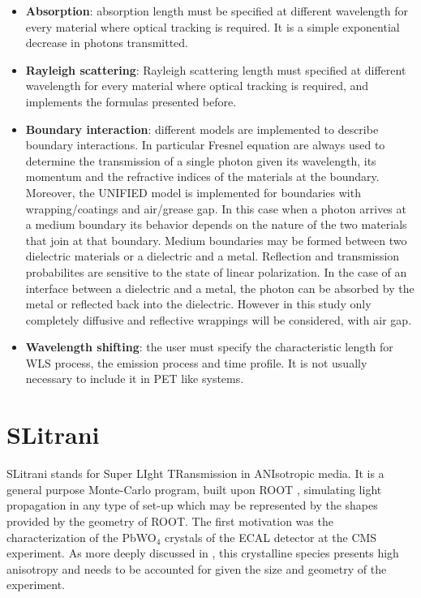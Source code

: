 \begin{itemize}
\item \textbf{Absorption}: absorption length must be specified at different wavelength for every material where optical tracking is required. It is a simple exponential decrease in photons transmitted.
\item \textbf{Rayleigh scattering}: Rayleigh scattering length must specified at different wavelength for every material where optical tracking is required, and implements the formulas presented before.
\item \textbf{Boundary interaction}: different models are implemented to describe boundary interactions. In particular Fresnel equation are always used to determine the transmission of a single photon given its wavelength, its momentum and the refractive indices of the materials at the boundary.
Moreover, the UNIFIED model is implemented for boundaries with wrapping/coatings and air/grease gap.
In this case when a photon arrives at a medium boundary its behavior depends on the nature of the two materials that join at that boundary. Medium boundaries may be formed between two dielectric materials or a dielectric and a metal. Reflection and transmission probabilites are sensitive to the state of linear polarization. In the case of an interface between a dielectric and a metal, the photon can be absorbed by the metal or reflected back into the dielectric.
However in this study only completely diffusive and reflective wrappings will be considered, with air gap.
\item \textbf{Wavelength shifting}: the user must specify the characteristic length for WLS process, the emission process and time profile. It is not usually necessary to include it in PET like systems.
\end{itemize}

\section{SLitrani}
SLitrani stands for Super LIght TRansmission in ANIsotropic media. It is a general purpose Monte-Carlo program, built upon ROOT \cite{ROOT}, simulating light propagation in any type of set-up which may be represented by the shapes provided by the geometry of ROOT. The first motivation was the characterization of the PbWO$_{4}$ crystals of the ECAL detector at the CMS experiment. As more deeply discussed in \cite{Gentit2002}, this crystalline species presents high anisotropy and needs to be accounted for given the size and geometry of the experiment.

